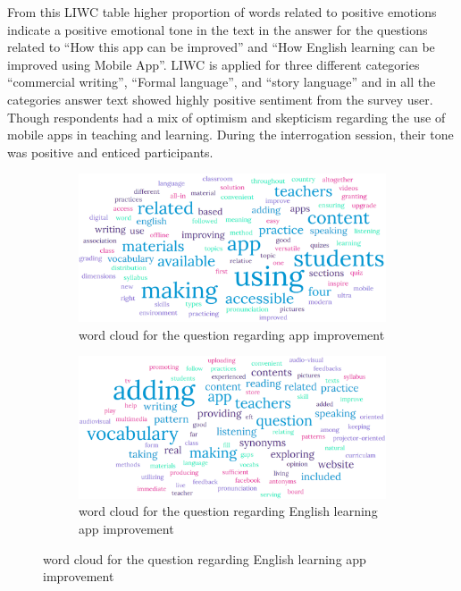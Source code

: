 \documentclass[sn-mathphys,Numbered]{sn-jnl}%
\theoremstyle{thmstyleone}%
\theoremstyle{thmstyletwo}%
\theoremstyle{thmstylethree}%
\begin{document}
From this LIWC table higher proportion of words related to positive
emotions indicate a positive emotional tone in the text in the answer
for the questions related to ``How this app can be improved'' and ``How
English learning can be improved using Mobile App''. LIWC is applied for
three different categories ``commercial writing'', ``Formal language'',
and ``story language'' and in all the categories answer text showed
highly positive sentiment from the survey user. Though respondents had a
mix of optimism and skepticism regarding the use of mobile apps in
teaching and learning. During the interrogation session, their tone was
positive and enticed participants.


\begin{figure}[h!]
\centering
\begin{subfigure}{0.48\textwidth}
    \includegraphics[width=\textwidth]{app_impv.png}
    \caption{word cloud for the question regarding app improvement}
    \label{word_cloud_1}
\end{subfigure}
\hfill
\begin{subfigure}{0.48\textwidth}
    \includegraphics[width=\textwidth]{eng_app_impv.png}
    \caption{word cloud for the question regarding English learning app improvement}
    \label{word_cloud_2}
\end{subfigure}       
\end{figure}
\end{document}
